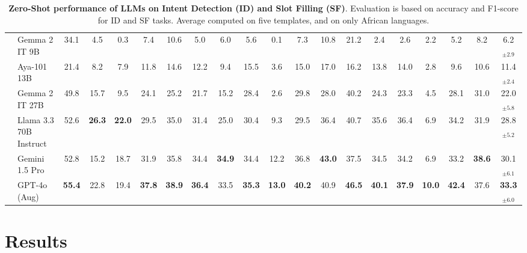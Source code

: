 \begin{table*}[!htpb]
{\begin{tabular}{l|l|cccccccccccccccccc}
& Gemma 2 IT 9B & 34.1 & 4.5 & 0.3 & 7.4 & 10.6 & 5.0 & 6.0 & 5.6 & 0.1 & 7.3 & 10.8 & 21.2 & 2.4 & 2.6 & 2.2 & 5.2 & 8.2 & 6.2$_{\pm2.9}$ \\ %
& Aya-101 13B & 21.4 & 8.2 & 7.9 & 11.8 & 14.6 & 12.2 & 9.4 & 15.5 & 3.6 & 15.0 & 17.0 & 16.2 & 13.8 & 14.0 & 2.8 & 9.6 & 10.6 & 11.4$_{\pm2.4}$ \\
& Gemma 2 IT 27B & 49.8 & 15.7 & 9.5 & 24.1 & 25.2 & 21.7 & 15.2 & 28.4 & 2.6 & 29.8 & 28.0 & 40.2 & 24.3 & 23.3 & 4.5 & 28.1 & 31.0 & 22.0$_{\pm5.8}$ \\
\rowcolor{Gray}
\cellcolor{white}
& Llama 3.3 70B Instruct & 52.6 & \textbf{26.3} & \textbf{22.0} & 29.5 & 35.0 & 31.4 & 25.0 & 30.4 & 9.3 & 29.5 & 36.4 & 40.7 & 35.6 & 36.4 & 6.9 & 34.2 & 31.9 & 28.8$_{\pm5.2}$ \\
\cmidrule{2-20}
& Gemini 1.5 Pro & 52.8 & 15.2 & 18.7 & 31.9 & 35.8 & 34.4 & \textbf{34.9} & 34.4 & 12.2 & 36.8 & \textbf{43.0} & 37.5 & 34.5 & 34.2 & 6.9 & 33.2 & \textbf{38.6} & 30.1$_{\pm6.1}$ \\
\rowcolor{LightCyan}
\cellcolor{white}
& GPT-4o (Aug) & \textbf{55.4} & 22.8 & 19.4 & \textbf{37.8} & \textbf{38.9} & \textbf{36.4} & 33.5 & \textbf{35.3} & \textbf{13.0} & \textbf{40.2} & 40.9 & \textbf{46.5} & \textbf{40.1} & \textbf{37.9} & \textbf{10.0} & \textbf{42.4} & 37.6 & \textbf{33.3$_{\pm6.0}$} \\

\bottomrule
\end{tabular}%
}
\vspace{-2mm}
\caption{\textbf{Zero-Shot performance of LLMs on Intent Detection (ID) and Slot Filling (SF)}. Evaluation is based on accuracy and F1-score for ID and SF tasks. Average computed on five templates, and on only African languages.}%
\label{tab:prompt-results}
\end{table*}


\section{Results}



